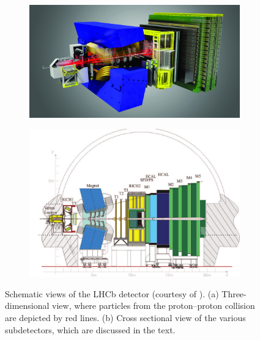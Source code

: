 \begin{figure}[ptb]
  \centering
  \begin{subfigure}{0.78\textwidth}
    \includegraphics[width=\textwidth]{graphics/intro/detector_3D_CMYK}
    \caption{}
    \label{fig:LHCb_3D}
  \end{subfigure}

  \vspace*{0.03\textwidth}
  \begin{subfigure}{\textwidth}
    \includegraphics[width=\textwidth]{graphics/intro/detector_cross_cmyk}
    \caption{}
    \label{fig:LHCb_cross}
  \end{subfigure}

  \caption{Schematic views of the LHCb detector (courtesy of \cern).
           (a) Three-dimensional view, where particles from the proton--proton collision are depicted by red lines.
           (b) Cross sectional view of the various subdetectors, which are discussed in the text.}
  \label{fig:LHCb}
\end{figure}

